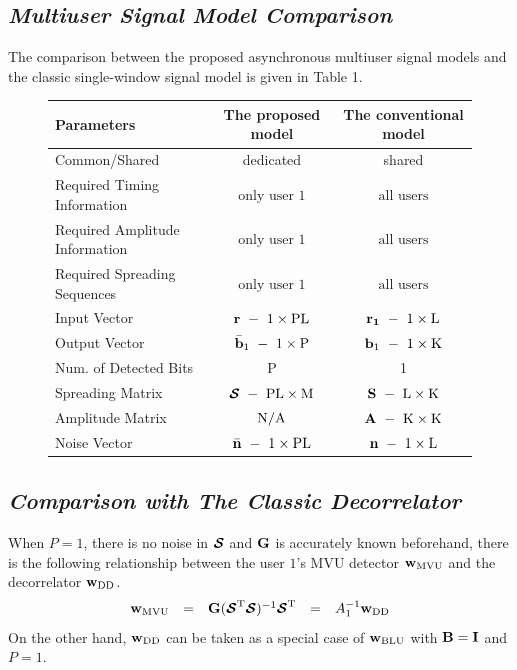 \documentclass[a4paper,10pt,fleqn, twocolumn]{IEEETran}
\newcommand{\bb}{{\bf b}}
\newcommand{\bG}{{\bf G}}
\newcommand{\bn}{{\bf n}}
\newcommand{\bw}{{\bf w}}
\newcommand{\bS}{{\bf S}}
\newcommand{\bI}{{\bf I}}
\newcommand{\bB}{{\bf B}}
\newcommand{\bcS}{{\mbox {\boldmath ${\cal S}$}}}
\begin{document}
\subsection{\em Multiuser Signal Model Comparison}
The comparison between the proposed asynchronous multiuser signal
models and the classic single-window signal model is given in
Table 1.
\begin{figure}[t]\label{ModelComp}
\begin{center}
\begin{tabular}{lcc}
Parameters&The proposed model&The conventional model\\
\hline
Common/Shared& dedicated& shared\\
Required Timing Information&$\mbox{only user 1}$ & $\mbox{all users}$\\
Required Amplitude Information&$\mbox{only user 1}$ & $\mbox{all users}$\\
Required Spreading Sequences&$\mbox{only user 1}$ & $\mbox{all users}$\\
\hline
Input Vector&$\bf{r}\ -\ \rm 1\times\rm PL$&$\bf{r}_1\ -\ \rm 1\times\rm L$\\
Output Vector &$\bar\bb_1\ -\ 1\times\rm P$&$\bb_1\ -\ 1\times\rm K$\\
Num. of Detected Bits& P & 1\\
Spreading Matrix &$\bcS\ -\ \rm PL\times\rm M$&$\bS\ -\ \rm L\times\rm K$\\
Amplitude Matrix &$\rm N/A$&$\bf{A}\ -\ \rm K\times\rm K$\\
Noise Vector &$\bar\bn\ -\ 1\times\rm PL$&$\bn\ -\
1\times\rm L$\\
\hline
\end{tabular}
\end{center}
\end{figure}

\subsection{\em Comparison with The Classic Decorrelator}
When $P=1$, there is no noise in $\bcS$ and $\bG$ is accurately
known beforehand, there is the following relationship between the
user $1$'s MVU detector $\bw_{\rm MVU}$ and the decorrelator
$\bw_{\rm DD}$.
\begin{equation}
\begin{array}{rcccl}
\bw_{\rm MVU}&=&\bG(\bcS^{\rm T}\bcS)^{-1}\bcS^{\rm
T}&=&A_1^{-1}\bw_{\rm DD}
\end{array}
\end{equation} \label{wN0}
\noindent On the other hand, $\bw_{\rm DD}$ can be taken as a
special case of $\bw_{\rm BLU}$ with $\bB =\bI$ and $P=1$.
\end{document}
